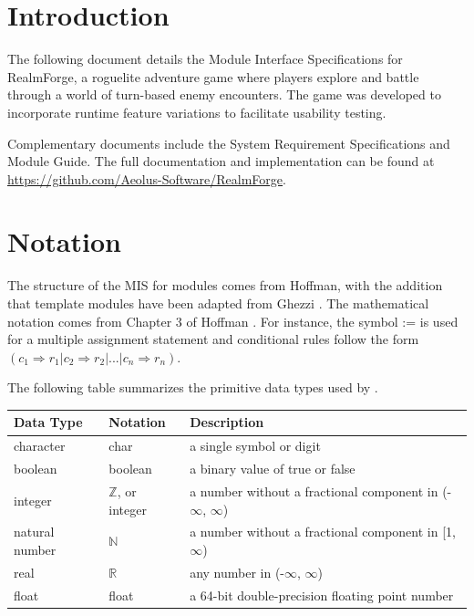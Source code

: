 \documentclass[12pt, titlepage]{article}
\begin{document}

\newpage

\tableofcontents

\newpage


\section{Introduction}\label{sec:introduction}

The following document details the Module Interface Specifications for RealmForge, a roguelite adventure game where players explore and battle through a world of turn-based enemy encounters. The game was developed to incorporate runtime feature variations to facilitate usability testing.

Complementary documents include the System Requirement Specifications
and Module Guide.  The full documentation and implementation can be
found at \url{https://github.com/Aeolus-Software/RealmForge}. 

\section{Notation}

The structure of the MIS for modules comes from Hoffman\cite{HoffmanAndStrooper1995},
with the addition that template modules have been adapted from Ghezzi
\cite{GhezziEtAl2003}.  The mathematical notation comes from Chapter 3 of Hoffman
\cite{HoffmanAndStrooper1995}.  For instance, the symbol := is used for a
multiple assignment statement and conditional rules follow the form $(c_1
\Rightarrow r_1 | c_2 \Rightarrow r_2 | ... | c_n \Rightarrow r_n )$.

The following table summarizes the primitive data types used by \progname. 

\begin{center}
	\renewcommand{\arraystretch}{1.2}
	\noindent 
	\begin{tabular}{l l p{7.5cm}} 
		\toprule 
		\textbf{Data Type} & \textbf{Notation} & \textbf{Description}\\ 
		\midrule
		character & char & a single symbol or digit\\
		boolean & boolean & a binary value of true or false \\
		integer & $\mathbb{Z}$, or integer & a number without a fractional 
		component in 
		(-$\infty$, $\infty$) \\
		natural number & $\mathbb{N}$ & a number without a fractional component 
		in [1, $\infty$) \\
		real & $\mathbb{R}$ & any number in (-$\infty$, $\infty$)\\
		float & float & a 64-bit double-precision floating point number\\
		
		\bottomrule
	\end{tabular} 
\end{center}
\end{document}
